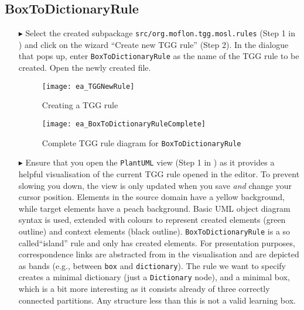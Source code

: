 \newpage
\hypertarget{rules vis}{}
\subsection{BoxToDictionaryRule}
\genHeader

\begin{enumerate}

\item[$\blacktriangleright$] Select the created subpackage \texttt{src/org.moflon.tgg.mosl.rules} (Step 1 in ) and click on the wizard ``Create new TGG rule'' (Step 2).
In the dialogue that pops up, enter \texttt{BoxToDictionaryRule} as the name of the TGG rule to be created.
Open the newly created file.

\begin{figure}[htbp]
\begin{center}
  \texttt{[image: ea\_TGGNewRule]}
  \caption{Creating a TGG rule}
  \label{ea:create_tgg_rule}
\end{center}
\end{figure}

\begin{figure}[htbp]
\begin{center}
  \texttt{[image: ea\_BoxToDictionaryRuleComplete]}
  \caption{Complete TGG rule diagram for \texttt{BoxToDictionaryRule}}
  \label{ea:boxtodictionaryrule_complete}
  \end{center}
\end{figure}

\item[$\blacktriangleright$]  Ensure that you open the \texttt{PlantUML} view (Step 1 in ) as it provides a helpful visualisation of the current TGG rule opened in the editor.
To prevent slowing you down, the view is only updated when you save \emph{and} change your cursor position.
Elements in the source domain have a yellow background, while target elements have a peach background.
Basic UML object diagram syntax is used, extended with colours to represent created elements (green outline) and context elements (black outline).
\texttt{BoxToDictionaryRule} is a so called``island'' rule and only has created elements.
For presentation purposes, correspondence links are abstracted from in the visualisation and are depicted as bands (e.g., between \texttt{box} and \texttt{dictionary}).
The rule we want to specify creates a minimal dictionary (just a \texttt{Dictionary} node), and a minimal box, which is a bit more interesting as it consists already of three correctly connected partitions.
Any structure less than this is not a valid learning box.


\end{enumerate}
